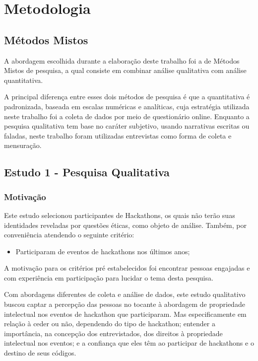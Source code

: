 \chapter{Metodologia}
\label{chp:metodologia}

\section{Métodos Mistos}
A abordagem escolhida durante a elaboração deste trabalho foi a de Métodos Mistos de pesquisa, a qual consiste em combinar análise qualitativa com análise quantitativa.

A principal diferença entre esses dois métodos de pesquisa é que a quantitativa é padronizada, baseada em escalas numéricas e analíticas, cuja estratégia utilizada neste trabalho foi a coleta de dados por meio de questionário online. Enquanto a pesquisa qualitativa tem base no caráter subjetivo, usando narrativas escritas ou faladas, neste trabalho foram utilizadas entrevistas como forma de coleta e mensuração.\citep{saldana2011fundamentals}

\section{Estudo 1 - Pesquisa Qualitativa}

\subsection{Motivação}

Este estudo selecionou participantes de Hackathons, os quais não terão suas identidades reveladas por questões éticas, como objeto de análise. Também, por conveniência atendendo o seguinte critério:
\begin{itemize}
    \item Participaram de eventos de hackathons nos últimos anos;
\end{itemize}

A motivação para os critérios pré estabelecidos foi encontrar pessoas engajadas e com experiência em participação para lucidar o tema desta pesquisa.

Com abordagens diferentes de coleta e análise de dados, este estudo qualitativo buscou captar a percepção das pessoas no tocante à abordagem de propriedade intelectual nos eventos de hackathon que participaram. Mas especificamente em relação à ceder ou não, dependendo do tipo de hackathon; entender a importância, na concepção dos entrevistados, dos direitos à propriedade intelectual nos eventos; e a confiança que eles têm ao participar de hackathons e o destino de seus códigos.

